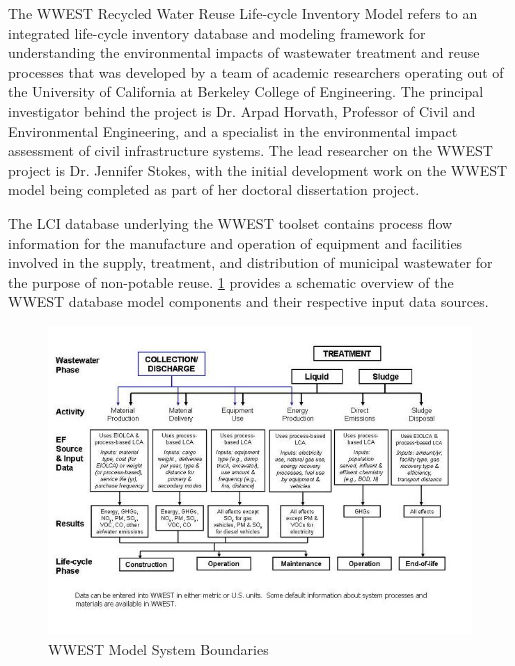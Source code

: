 The WWEST Recycled Water Reuse Life-cycle Inventory Model refers to an integrated life-cycle inventory database and modeling framework for understanding the environmental impacts of wastewater treatment and reuse processes that was developed by a team of academic researchers operating out of the University of California at Berkeley College of Engineering. The principal investigator behind the project is Dr. Arpad Horvath, Professor of Civil and Environmental Engineering, and a specialist in the environmental impact assessment of civil infrastructure systems. The lead researcher on the WWEST project is Dr. Jennifer Stokes, with the initial development work on the WWEST model being completed as part of her doctoral dissertation project.

The LCI database underlying the WWEST toolset contains process flow information for the manufacture and operation of equipment and facilities involved in the supply, treatment, and distribution of municipal wastewater for the purpose of non-potable reuse. \ref{fig:WWESTsystem} 
provides a schematic overview of the WWEST database model components and their respective input data sources.

    \begin{figure}[!h]
        \begin{center}
        \includegraphics[width=5.5in]{figures/WWEST_System_Boundaries.jpg}
        \caption{WWEST Model System Boundaries}
        \label{fig:WWESTsystem}
        \end{center}
    \end{figure}
    
